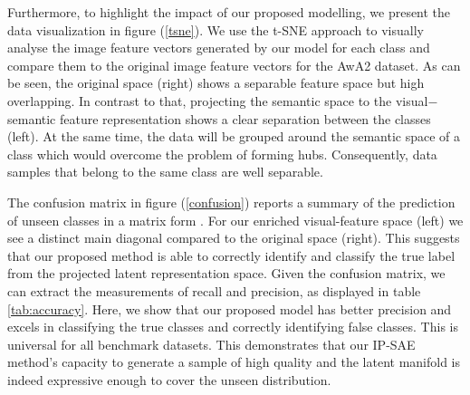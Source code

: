 \documentclass{article}
\begin{document}
Furthermore, to highlight the impact of our proposed modelling, we present the data visualization in figure (\ref{tsne}). We use the t-SNE \cite{b59} approach to visually analyse the image feature vectors generated by our model for each class and compare them to the original image feature vectors for the AwA2 dataset. As can be seen, the original space (right) shows a separable feature space but high overlapping. In contrast to that, projecting the semantic space to the visual$-$semantic feature representation shows a clear separation between the classes (left). At the same time, the data will be grouped around the semantic space of a class which would overcome the problem of forming hubs. Consequently, data samples that belong to the same class are well separable.

The confusion matrix in figure (\ref{confusion}) reports a summary of the prediction of unseen classes in a matrix form \cite{b74}. For our enriched visual-feature space (left) we see a distinct main diagonal compared to the original space (right). This suggests that our proposed method is able to correctly identify and classify the true label from the projected latent representation space. Given the confusion matrix, we can extract the measurements of recall and precision, as displayed in table \ref{tab:accuracy}. Here, we show that our proposed model has better precision and excels in classifying the true classes and correctly identifying false classes. This is universal for all benchmark datasets. This demonstrates that our IP-SAE method's capacity to generate a sample of high quality and the latent manifold is indeed expressive enough to cover the unseen distribution.
\end{document}
